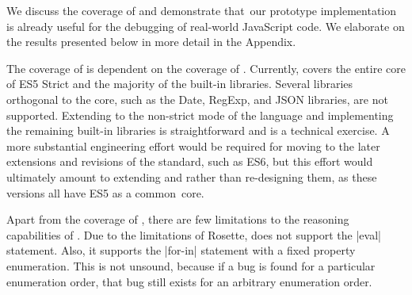 
We discuss the coverage of \cosette and demonstrate that~our prototype implementation is already  useful for the debugging of real-world JavaScript code.
We elaborate on the results presented below in more detail in the Appendix. 





The coverage of \cosette is dependent on the coverage of \JSComp.
Currently, \JSComp covers the entire core of ES5 Strict and the majority of the built-in libraries.
Several libraries orthogonal to the core, such as the Date, RegExp, and JSON libraries, are not supported.
Extending \JSComp to the non-strict mode of the language and implementing the remaining built-in libraries is straightforward and is a technical exercise.
A more substantial engineering effort would be required for moving to the later extensions and revisions of the standard, such as ES6, but this effort would ultimately amount to extending \jsil and \JSComp rather than re-designing them, as these versions all have ES5 as a common~core.

Apart from the coverage of \JSComp, there are few limitations to the reasoning capabilities of \cosette. Due to the limitations of Rosette, \cosette does not support the \jsinline|eval| statement. Also, it supports the \jsinline|for-in| statement with a fixed property enumeration. This is not unsound, because if a bug is found for a particular enumeration order, that bug still exists for an arbitrary enumeration order.

